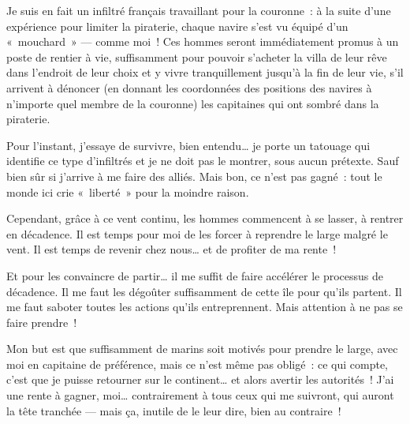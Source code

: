 {
		Je suis en fait un infiltré français travaillant pour la couronne~:  à la suite d’une expérience pour limiter la piraterie, chaque navire s’est vu équipé d’un «~mouchard~» — comme moi~!
		Ces hommes seront immédiatement promus à un poste de rentier à vie, suffisamment pour pouvoir s’acheter la villa de leur rêve dans l’endroit de leur choix et y vivre tranquillement jusqu’à la fin de leur vie, s’il arrivent à dénoncer (en donnant les coordonnées des positions des navires à n’importe quel membre de la couronne) les capitaines qui ont sombré dans la piraterie.

		Pour l’instant, j’essaye de survivre, bien entendu… je porte un tatouage qui identifie ce type d’infiltrés et je ne doit pas le montrer, sous aucun prétexte.
		Sauf bien sûr si j’arrive à me faire des alliés.
		Mais bon, ce n’est pas gagné~:  tout le monde ici crie «~liberté~» pour la moindre raison.

		Cependant, grâce à ce vent continu, les hommes commencent à se lasser, à rentrer en décadence.
		Il est temps pour moi de les forcer à reprendre le large malgré le vent.
		Il est temps de revenir chez nous… et de profiter de ma rente~!

		Et pour les convaincre de partir… il me suffit de faire accélérer le processus de décadence.
		Il me faut les dégoûter suffisamment de cette île pour qu’ils partent.
		Il me faut saboter toutes les actions qu’ils entreprennent.
		Mais attention à ne pas se faire prendre~!

		Mon but est que suffisamment de marins soit motivés pour prendre le large, avec moi en capitaine de préférence, mais ce n’est même pas obligé~:  ce qui compte, c’est que je puisse retourner sur le continent… et alors avertir les autorités~!
		J’ai une rente à gagner, moi… contrairement à tous ceux qui me suivront, qui auront la tête tranchée — mais ça, inutile de le leur dire, bien au contraire~!
}

